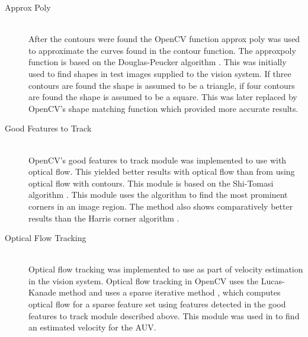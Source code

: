 \begin{description}
\item[Approx Poly]\hfill \\
After the contours were found the OpenCV function approx poly was used to approximate the curves found in the contour function. The approxpoly function is based on the Douglas-Peucker algorithm \cite{article:douglas}. This was initially used to find shapes in test images supplied to the vision system. If three contours are found the shape is assumed to be a triangle, if four contours are found the shape is assumed to be a square. This was later replaced by OpenCV's shape matching function which provided more accurate results.

\item[Good Features to Track]\hfill \\
OpenCV's good features to track module was implemented to use with optical flow. This yielded better results with optical flow than from using optical flow with contours. This module is based on the Shi-Tomasi algorithm \cite{article:tomasi}. This module uses the algorithm to find the most prominent corners in an image region. The method also shows comparatively better results than the Harris corner algorithm \cite{article:tomasi}.

\item[Optical Flow Tracking]\hfill \\
Optical flow tracking was implemented to use as part of velocity estimation in the vision system. Optical flow tracking in OpenCV uses the Lucas-Kanade method and uses a sparse iterative method \cite{web:opticalFlow}, which computes optical flow for a sparse feature set using features detected in the good features to track module described above. This module was used in to find an estimated velocity for the AUV.

\end{description}

